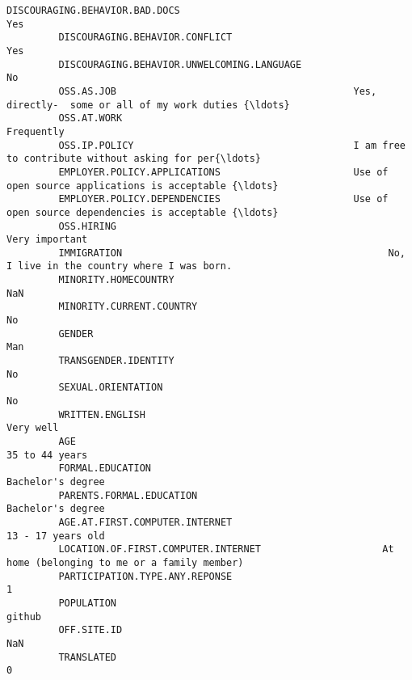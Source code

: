 \documentclass[11pt]{article}
\begin{document}
\begin{Verbatim}[commandchars=\\\{\}]
         DISCOURAGING.BEHAVIOR.BAD.DOCS                                                                   Yes   
         DISCOURAGING.BEHAVIOR.CONFLICT                                                                   Yes   
         DISCOURAGING.BEHAVIOR.UNWELCOMING.LANGUAGE                                                        No   
         OSS.AS.JOB                                         Yes, directly-  some or all of my work duties {\ldots}   
         OSS.AT.WORK                                                                               Frequently   
         OSS.IP.POLICY                                      I am free to contribute without asking for per{\ldots}   
         EMPLOYER.POLICY.APPLICATIONS                       Use of open source applications is acceptable {\ldots}   
         EMPLOYER.POLICY.DEPENDENCIES                       Use of open source dependencies is acceptable {\ldots}   
         OSS.HIRING                                                                            Very important   
         IMMIGRATION                                              No, I live in the country where I was born.   
         MINORITY.HOMECOUNTRY                                                                             NaN   
         MINORITY.CURRENT.COUNTRY                                                                          No   
         GENDER                                                                                           Man   
         TRANSGENDER.IDENTITY                                                                              No   
         SEXUAL.ORIENTATION                                                                                No   
         WRITTEN.ENGLISH                                                                            Very well   
         AGE                                                                                   35 to 44 years   
         FORMAL.EDUCATION                                                                   Bachelor's degree   
         PARENTS.FORMAL.EDUCATION                                                           Bachelor's degree   
         AGE.AT.FIRST.COMPUTER.INTERNET                                                     13 - 17 years old   
         LOCATION.OF.FIRST.COMPUTER.INTERNET                     At home (belonging to me or a family member)   
         PARTICIPATION.TYPE.ANY.REPONSE                                                                     1   
         POPULATION                                                                                    github   
         OFF.SITE.ID                                                                                      NaN   
         TRANSLATED                                                                                         0   
         

\end{Verbatim}
\end{document}
